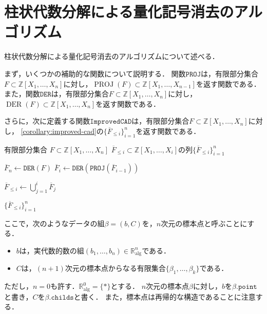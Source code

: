 \documentclass[uplatex, dvipdfmx]{jsarticle}
\numberwithin{equation}{section}
\newcommand{\Ralg}{\mathbb{R}_\mathrm{alg}}
\newcommand{\Z}{\mathbb{Z}}
\DeclareMathOperator{\PROJ}{PROJ}
\DeclareMathOperator{\DER}{DER}
\theoremstyle{definition}
\begin{document}
\section{柱状代数分解による量化記号消去のアルゴリズム} \label{section:9}

柱状代数分解による量化記号消去のアルゴリズムについて述べる．

まず，いくつかの補助的な関数について説明する．
関数$\mathtt{PROJ}$は，有限部分集合$F \subset \Z[X_1, \dots, X_n]$に対し，$\PROJ(F) \subset \Z[X_1, \dots, X_{n-1}]$を返す関数である．
また，関数$\mathtt{DER}$は，有限部分集合$F \subset \Z[X_1, \dots, X_n]$に対し，$\DER(F) \subset \Z[X_1, \dots, X_n]$を返す関数である．

さらに，次に定義する関数$\mathtt{ImprovedCAD}$は，有限部分集合$F \subset \Z[X_1, \dots, X_n]$に対し，
\cref{corollary:improved-cad}の$\{\overline{F}_{\leq i}\}_{i=1}^n$を返す関数である．

\begin{algorithm}[H]
     \caption {$\mathtt{ImprovedCAD}(F)$}
     \begin{algorithmic}[1]
          \REQUIRE 
               有限部分集合
               $F \subset \Z[X_1, \dots, X_n]$
          \ENSURE 
               $ \overline{F}_{\leq i} \subset \Z[X_1, \dots, X_i]$の列$\{\overline{F}_{\leq i}\}_{i=1}^n$

                    \STATE $\overline{F}_n \leftarrow \mathtt{DER} (F)$
               \ELSE
                    \STATE $\overline{F}_i \leftarrow \mathtt{DER} (\mathtt{PROJ} (\overline{F}_{i-1}))$
               \ENDIF
          \ENDFOR

               \STATE $\overline{F}_{\leq i} \leftarrow \bigcup_{j=1}^i \overline{F}_j$
          \ENDFOR

          \RETURN $\{\overline{F}_{\leq i}\}_{i=1}^n$
     \end{algorithmic}

\end{algorithm}


ここで，次のようなデータの組$\beta = (b, C)$を，$n$次元の標本点と呼ぶことにする．
\begin{itemize}
     \item $b$は，実代数的数の組$(b_1, \dots, b_n) \in \Ralg^n$である．
     \item $C$は，$(n+1)$次元の標本点からなる有限集合$\{\beta_1, \dots, \beta_k\}$である．
\end{itemize}
ただし，$n=0$も許す．$\Ralg^0 = \{\mathord{*}\}$とする．
$n$次元の標本点$\beta$に対し，$b$を$\beta.\mathtt{point}$と書き，$C$を$\beta.\mathtt{childs}$と書く．
また，標本点は再帰的な構造であることに注意する．
\end{document}
